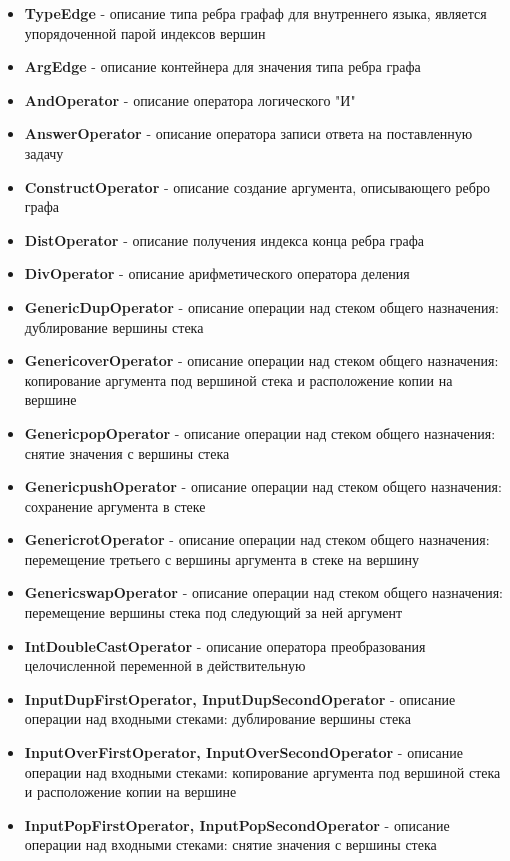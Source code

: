 \documentclass[russian,utf8,emptystyle]{eskdtext}
\begin{document}
\begin{spacing}{1.5}
\begin{itemize}
\item \textbf{TypeEdge} - описание типа ребра графаф для внутреннего языка, является упорядоченной парой индексов вершин
\item \textbf{ArgEdge} - описание контейнера для значения типа ребра графа
\item \textbf{AndOperator} - описание оператора логического "И"
\item \textbf{AnswerOperator} - описание оператора записи ответа на поставленную задачу
\item \textbf{ConstructOperator} - описание создание аргумента, описывающего ребро графа
\item \textbf{DistOperator} - описание получения индекса конца ребра графа
\item \textbf{DivOperator} - описание арифметического оператора деления
\item \textbf{GenericDupOperator} - описание операции над стеком общего назначения: дублирование вершины стека
\item \textbf{GenericoverOperator} - описание операции над стеком общего назначения: копирование аргумента под вершиной стека и расположение копии на вершине
\item \textbf{GenericpopOperator} - описание операции над стеком общего назначения: снятие значения с вершины стека
\item \textbf{GenericpushOperator} - описание операции над стеком общего назначения: сохранение аргумента в стеке
\item \textbf{GenericrotOperator} -  описание операции над стеком общего назначения: перемещение третьего с вершины аргумента в стеке на вершину
\item \textbf{GenericswapOperator} - описание операции над стеком общего назначения: перемещение вершины стека под следующий за ней аргумент
\item \textbf{IntDoubleCastOperator} -  описание оператора преобразования целочисленной переменной в действительную
\item \textbf{InputDupFirstOperator, InputDupSecondOperator} - описание операции над входными стеками: дублирование вершины стека
\item \textbf{InputOverFirstOperator, InputOverSecondOperator} - описание операции над входными стеками: копирование аргумента под вершиной стека и расположение копии на вершине
\item \textbf{InputPopFirstOperator, InputPopSecondOperator} - описание операции над входными стеками: снятие значения с вершины стека

\end{itemize}
\end{spacing}
\end{document}
